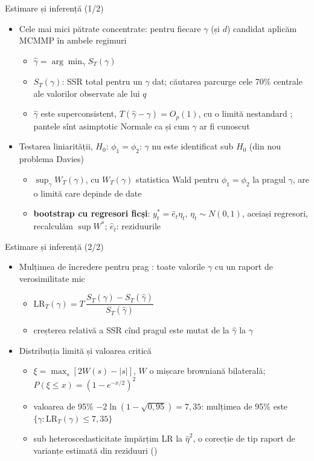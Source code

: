\begin{frame}{Estimare și inferență (1/2)}
\itemsize{\small}
\begin{itemize}
    \item Cele mai mici pătrate concentrate: pentru fiecare $\gamma$ (și $d$) candidat aplicăm MCMMP în ambele regimuri
    \begin{itemize}
        \item $\hat\gamma = \arg\min_\gamma S_T(\gamma)$
        \item $S_T(\gamma)$: SSR total pentru un $\gamma$ dat; căutarea parcurge cele 70\% centrale ale valorilor observate ale lui $q$
        \item $\hat\gamma$ este superconsistent, $T(\hat\gamma - \gamma) = O_p(1)$, cu o limită nestandard ; pantele sînt asimptotic Normale ca și cum $\gamma$ ar fi cunoscut
    \end{itemize}
    \item Testarea liniarității, $H_0$: $\phi_1 = \phi_2$: $\gamma$ nu este identificat sub $H_0$ (din nou problema Davies) 
    \begin{itemize}
        \item $\sup_\gamma W_T(\gamma)$, cu $W_T(\gamma)$ statistica Wald pentru $\phi_1 = \phi_2$ la pragul $\gamma$, are o limită care depinde de date
        \item \textbf{bootstrap cu regresori ficși}: $y_t^* = \hat e_t\eta_t$, $\eta_t \sim N(0, 1)$, aceiași regresori, recalculăm $\sup W^*$; $\hat e_t$: reziduurile
    \end{itemize}
\end{itemize}
\end{frame}

\begin{frame}{Estimare și inferență (2/2)}
\itemsize{\small}
\begin{itemize}
    \item Mulțimea de încredere pentru prag : toate valorile $\gamma$ cu un raport de verosimilitate mic
    \begin{itemize}
        \item $\mathrm{LR}_T(\gamma) = T\,\dfrac{S_T(\gamma) - S_T(\hat\gamma)}{S_T(\hat\gamma)}$
        \item creșterea relativă a SSR cînd pragul este mutat de la $\hat\gamma$ la $\gamma$
    \end{itemize}
    \item Distribuția limită și valoarea critică
    \begin{itemize}
        \item $\xi = \max_s[2W(s) - |s|]$, $W$ o mișcare browniană bilaterală; $P(\xi \le x) = (1 - e^{-x/2})^2$
        \item valoarea de 95\% $-2\ln(1 - \sqrt{0{,}95}) = 7{,}35$: mulțimea de 95\% este $\{\gamma: \mathrm{LR}_T(\gamma) \le 7{,}35\}$
        \item sub heteroscedasticitate împărțim LR la $\hat\eta^2$, o corecție de tip raport de varianțe estimată din reziduuri ()
    \end{itemize}
\end{itemize}
\end{frame}

